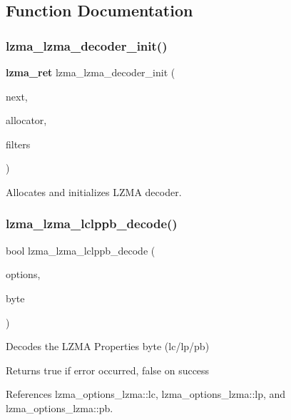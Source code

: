 \subsection{Function Documentation}
\mbox{\label{lzma__decoder_8h_aba4aaf8db97928fbdc5143d73beeaa02}} 
\subsubsection{lzma\+\_\+lzma\+\_\+decoder\+\_\+init()}
{\footnotesize\ttfamily \textbf{ lzma\+\_\+ret} lzma\+\_\+lzma\+\_\+decoder\+\_\+init (\begin{DoxyParamCaption}\item[{\textbf{ lzma\+\_\+next\+\_\+coder} $\ast$}]{next,  }\item[{const \textbf{ lzma\+\_\+allocator} $\ast$}]{allocator,  }\item[{const \textbf{ lzma\+\_\+filter\+\_\+info} $\ast$}]{filters }\end{DoxyParamCaption})}



Allocates and initializes L\+Z\+MA decoder. 

\mbox{\label{lzma__decoder_8h_a4907f7d9047a0c9990bdaf943ae8a181}} 
\subsubsection{lzma\+\_\+lzma\+\_\+lclppb\+\_\+decode()}
{\footnotesize\ttfamily bool lzma\+\_\+lzma\+\_\+lclppb\+\_\+decode (\begin{DoxyParamCaption}\item[{\textbf{ lzma\+\_\+options\+\_\+lzma} $\ast$}]{options,  }\item[{uint8\+\_\+t}]{byte }\end{DoxyParamCaption})}



Decodes the L\+Z\+MA Properties byte (lc/lp/pb) 

\begin{DoxyReturn}{Returns}
true if error occurred, false on success 
\end{DoxyReturn}


References lzma\+\_\+options\+\_\+lzma\+::lc, lzma\+\_\+options\+\_\+lzma\+::lp, and lzma\+\_\+options\+\_\+lzma\+::pb.

